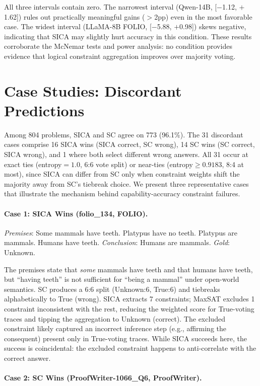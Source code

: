 All three intervals contain zero. The narrowest interval (Qwen-14B, [$-$1.12, $+$1.62]) rules out practically meaningful gains ($>$2pp) even in the most favorable case. The widest interval (LLaMA-8B FOLIO, [$-$5.88, $+$0.98]) skews negative, indicating that SICA may slightly hurt accuracy in this condition. These results corroborate the McNemar tests and power analysis: no condition provides evidence that logical constraint aggregation improves over majority voting.


\section{Case Studies: Discordant Predictions}
\label{app:case-studies}

Among 804 problems, SICA and SC agree on 773 (96.1\%). The 31 discordant cases comprise 16 SICA wins (SICA correct, SC wrong), 14 SC wins (SC correct, SICA wrong), and 1 where both select different wrong answers. All 31 occur at exact ties (entropy${=}1.0$, 6:6 vote split) or near-ties (entropy${\geq}0.9183$, 8:4 at most), since SICA can differ from SC only when constraint weights shift the majority away from SC's tiebreak choice. We present three representative cases that illustrate the mechanism behind capability-accuracy constraint failures.

\paragraph{Case 1: SICA Wins (folio\_134, FOLIO).}

\emph{Premises}: Some mammals have teeth. Platypus have no teeth. Platypus are mammals. Humans have teeth. \emph{Conclusion}: Humans are mammals. \emph{Gold}: Unknown.

The premises state that \emph{some} mammals have teeth and that humans have teeth, but ``having teeth'' is not sufficient for ``being a mammal'' under open-world semantics. SC produces a 6:6 split (Unknown:6, True:6) and tiebreaks alphabetically to True (wrong). SICA extracts 7 constraints; MaxSAT excludes 1 constraint inconsistent with the rest, reducing the weighted score for True-voting traces and tipping the aggregation to Unknown (correct). The excluded constraint likely captured an incorrect inference step (e.g., affirming the consequent) present only in True-voting traces. While SICA succeeds here, the success is coincidental: the excluded constraint happens to anti-correlate with the correct answer.

\paragraph{Case 2: SC Wins (ProofWriter-1066\_Q6, ProofWriter).}

